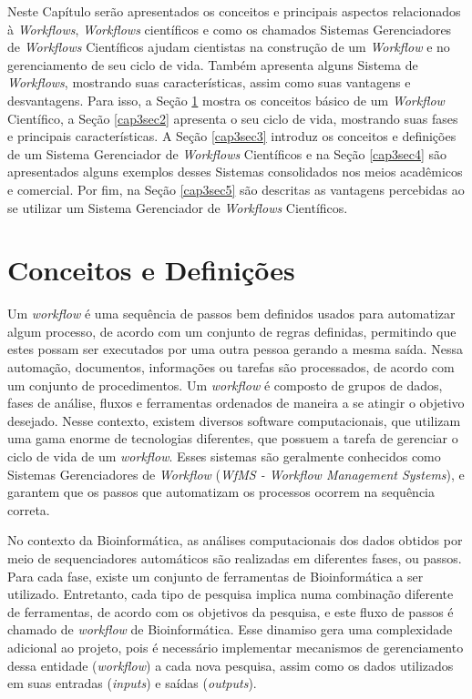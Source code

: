 Neste Capítulo serão apresentados os conceitos e principais aspectos relacionados à \textit{Workflows}, \textit{Workflows} científicos e como os chamados Sistemas Gerenciadores de \textit{Workflows} Científicos ajudam cientistas na construção de um \textit{Workflow} e no gerenciamento de seu ciclo de vida. Também apresenta alguns Sistema de \textit{Workflows}, mostrando suas características, assim como suas vantagens e desvantagens. Para isso, a Seção \ref{cap3sec1} mostra os conceitos básico de um \textit{Workflow} Científico, a Seção \ref{cap3sec2} apresenta o seu ciclo de vida, mostrando suas fases e principais características. A Seção \ref{cap3sec3} introduz os conceitos e definições de um Sistema Gerenciador de \textit{Workflows} Científicos e na Seção \ref{cap3sec4} são apresentados alguns exemplos desses Sistemas consolidados nos meios acadêmicos e comercial. Por fim, na Seção \ref{cap3sec5} são descritas as vantagens percebidas ao se utilizar um Sistema Gerenciador de \textit{Workflows} Científicos.

\section{Conceitos e Definições} \label{cap3sec1}

Um \textit{workflow} é uma sequência de passos bem definidos usados para automatizar algum processo, de acordo com um conjunto de regras definidas, permitindo que estes possam ser executados por uma outra pessoa gerando a mesma saída. Nessa automação, documentos, informações ou tarefas são processados, de acordo com um conjunto de procedimentos. Um \textit{workflow} é composto de grupos de dados, fases de análise, fluxos e ferramentas ordenados de maneira a se atingir o objetivo desejado. Nesse contexto, existem diversos software computacionais, que utilizam uma gama enorme de tecnologias diferentes, que possuem a tarefa de gerenciar o ciclo de vida de um \textit{workflow}. Esses sistemas são geralmente conhecidos como Sistemas Gerenciadores de \textit{Workflow} (\textit{WfMS - Workflow Management Systems}), e garantem que os passos que automatizam os processos ocorrem na sequência correta.

No contexto da Bioinformática, as análises computacionais dos dados obtidos por meio de sequenciadores automáticos são realizadas em diferentes fases, ou passos. Para cada fase, existe um conjunto de ferramentas de Bioinformática a ser utilizado. Entretanto, cada tipo de pesquisa implica numa combinação diferente de ferramentas, de acordo com os objetivos da pesquisa, e este fluxo de passos é chamado de \textit{workflow} de Bioinformática. Esse dinamiso gera uma complexidade adicional ao projeto, pois é necessário implementar mecanismos de gerenciamento dessa entidade (\textit{workflow}) a cada nova pesquisa, assim como os dados utilizados em suas entradas (\textit{inputs}) e saídas (\textit{outputs}).

